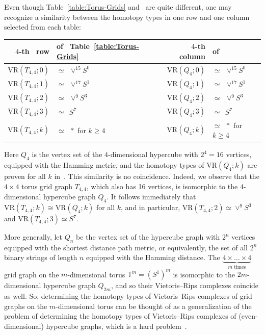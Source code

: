 \documentclass[12pt,a4paper]{amsart}
\theoremstyle{definition}
\newcommand{\T}{\ensuremath{\mathbb{T}}}
\newcommand{\vr}[2]{\mathrm{VR}(#1;#2)}
\numberwithin{equation}{section}
\begin{document}
Even though Table~\ref{table:Torus-Grids} and~\cite[Table~1]{adamaszek2022vietoris} are quite different, one may recognize a similarity between the homotopy types in one row and one column selected from each table:
\begin{center}
\begin{tabular}{|rl|rl|}
\hline
$4$-th \ row&of \ Table~\ref{table:Torus-Grids} &
$4$-th \ column&of \ \cite[Table~1]{adamaszek2022vietoris} \\
\hline
$\vr{T_{4,4}}{0}$&$\simeq\ \ \vee^{15} S^0$ &
$\vr{Q_4}{0}$&$\simeq\ \ \vee^{15} S^0$ \\
$\vr{T_{4,4}}{1}$&$\simeq\ \ \vee^{17} S^1$ &
$\vr{Q_4}{1}$&$\simeq\ \ \vee^{17} S^1$ \\
$\vr{T_{4,4}}{2}$&$\simeq\ \ \vee^9 S^3$ &
$\vr{Q_4}{2}$&$\simeq\ \ \vee^9 S^3$ \\
$\vr{T_{4,4}}{3}$&$\simeq\ \ S^7$ &
$\vr{Q_4}{3}$&$\simeq\ \ S^7$ \\
$\vr{T_{4,4}}{k}$&$\simeq\ \ *$ for $k\ge 4$ &
$\vr{Q_4}{k}$&$\simeq\ \ *$ for $k\ge 4$ \\
\hline
\end{tabular}
\end{center}
Here $Q_4$ is the vertex set of the $4$-dimensional hypercube with $2^4=16$ vertices, equipped with the Hamming metric, and the homotopy types of $\vr{Q_4}{k}$ are proven for all $k$ in~\cite{adamaszek2022vietoris}.
This similarity is no coincidence.
Indeed, we observe that the $4\times 4$ torus grid graph $T_{4,4}$, which also has 16 vertices, is isomorphic to the $4$-dimensional hypercube graph $Q_4$.
It follows immediately that $\vr{T_{4,4}}{k}\cong \vr{Q_4}{k}$ for all $k$, and in particular, $\vr{T_{4,4}}{2}\simeq\vee^9 S^3$ and $\vr{T_{4,4}}{3}\simeq S^7$.

More generally, let $Q_n$ be the vertex set of the hypercube graph with $2^n$ vertices equipped with the shortest distance path metric, or equivalently, the set of all $2^{n}$ binary strings of length $n$ equipped with the Hamming distance.
The $\underbrace{4\times\ldots\times 4}_{m\text{ times}}$ grid graph on the $m$-dimensional torus $\T^m=(S^1)^m$ is isomorphic to the $2m$-dimensional hypercube graph $Q_{2m}$, and so their Vietoris--Rips complexes coincide as well.
So, determining the homotopy types of Vietoris--Rips complexes of grid graphs on the $m$-dimensional torus can be thought of as a generalization of the problem of determining the homotopy types of Vietoris--Rips complexes of (even-dimensional) hypercube graphs, which is a hard problem~\cite{adamaszek2022vietoris,shukla2022vietoris,adams2024lower,feng2023homotopy,feng2023vietoris,feng2024exploring}.
\end{document}
